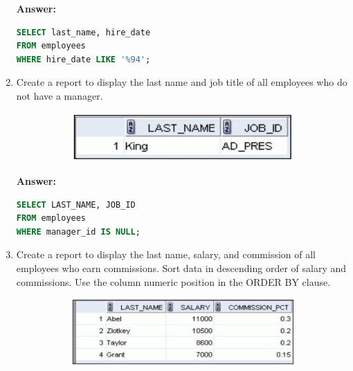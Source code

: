 \documentclass[a4paper,12pt]{article}
\begin{document}
\begin{enumerate}
    \textbf{Answer: }
    \begin{lstlisting}[language=SQL, label={lst:employees_data}]
SELECT last_name, hire_date
FROM employees
WHERE hire_date LIKE '%94';
    \end{lstlisting}

    \item Create a report to display the last name and job title of all employees who do not have a
manager.
\begin{figure}[h]
        \centering
        \begin{subfigure}[b]{0.35\linewidth}
            \centering
            \includegraphics[width=\linewidth]{graphics/28.png}
        \end{subfigure}
    \end{figure}        
    
    \textbf{Answer: }
    \begin{lstlisting}[language=SQL, label={lst:employees_data}]
SELECT LAST_NAME, JOB_ID
FROM employees
WHERE manager_id IS NULL;
    \end{lstlisting}
    \item Create a report to display the last name, salary, and commission of all employees who earn
commissions. Sort data in descending order of salary and commissions.
Use the column numeric position in the ORDER BY clause.
\begin{figure}[h]
        \centering
        \begin{subfigure}[b]{0.35\linewidth}
            \centering
            \includegraphics[width=\linewidth]{graphics/29.png}
        \end{subfigure}
    \end{figure}        
    

\end{enumerate}
\end{document}
